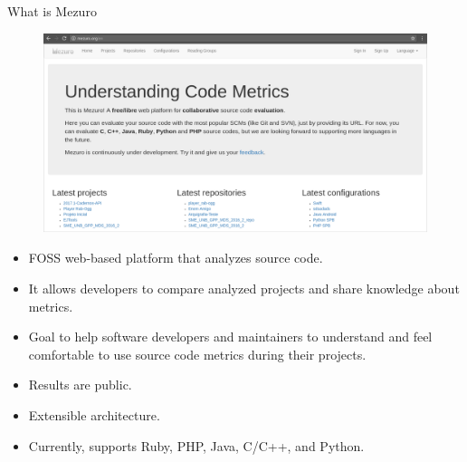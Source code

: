 \begin{block}{What is Mezuro}
    \begin{figure}
        \begin{center}
            \includegraphics[width=\textwidth]{figures/MezuroHome.png}
            \label{fig:feature1}
        \end{center}
    \end{figure}

    \begin{itemize}
        \item FOSS web-based platform that analyzes source code.

        \item It allows developers to compare analyzed projects and share
            knowledge about metrics.

        \item Goal to help software developers and maintainers to understand
            and feel comfortable to use source code metrics during their projects.

        \item Results are public.

        \item Extensible architecture.

        \item Currently, supports Ruby, PHP, Java, C/C++, and Python.

    \end{itemize}
\end{block}
